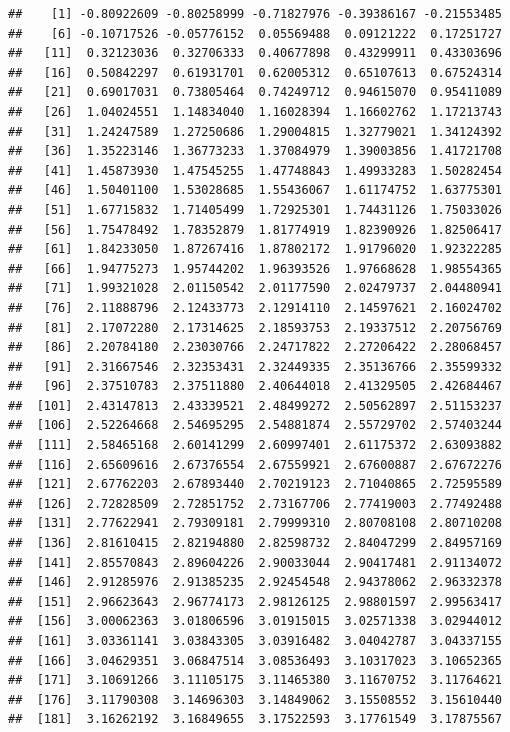 \documentclass[
  11pt]{report}
\begin{document}
\begin{itemize}
\begin{verbatim}
##    [1] -0.80922609 -0.80258999 -0.71827976 -0.39386167 -0.21553485
##    [6] -0.10717526 -0.05776152  0.05569488  0.09121222  0.17251727
##   [11]  0.32123036  0.32706333  0.40677898  0.43299911  0.43303696
##   [16]  0.50842297  0.61931701  0.62005312  0.65107613  0.67524314
##   [21]  0.69017031  0.73805464  0.74249712  0.94615070  0.95411089
##   [26]  1.04024551  1.14834040  1.16028394  1.16602762  1.17213743
##   [31]  1.24247589  1.27250686  1.29004815  1.32779021  1.34124392
##   [36]  1.35223146  1.36773233  1.37084979  1.39003856  1.41721708
##   [41]  1.45873930  1.47545255  1.47748843  1.49933283  1.50282454
##   [46]  1.50401100  1.53028685  1.55436067  1.61174752  1.63775301
##   [51]  1.67715832  1.71405499  1.72925301  1.74431126  1.75033026
##   [56]  1.75478492  1.78352879  1.81774919  1.82390926  1.82506417
##   [61]  1.84233050  1.87267416  1.87802172  1.91796020  1.92322285
##   [66]  1.94775273  1.95744202  1.96393526  1.97668628  1.98554365
##   [71]  1.99321028  2.01150542  2.01177590  2.02479737  2.04480941
##   [76]  2.11888796  2.12433773  2.12914110  2.14597621  2.16024702
##   [81]  2.17072280  2.17314625  2.18593753  2.19337512  2.20756769
##   [86]  2.20784180  2.23030766  2.24717822  2.27206422  2.28068457
##   [91]  2.31667546  2.32353431  2.32449335  2.35136766  2.35599332
##   [96]  2.37510783  2.37511880  2.40644018  2.41329505  2.42684467
##  [101]  2.43147813  2.43339521  2.48499272  2.50562897  2.51153237
##  [106]  2.52264668  2.54695295  2.54881874  2.55729702  2.57403244
##  [111]  2.58465168  2.60141299  2.60997401  2.61175372  2.63093882
##  [116]  2.65609616  2.67376554  2.67559921  2.67600887  2.67672276
##  [121]  2.67762203  2.67893440  2.70219123  2.71040865  2.72595589
##  [126]  2.72828509  2.72851752  2.73167706  2.77419003  2.77492488
##  [131]  2.77622941  2.79309181  2.79999310  2.80708108  2.80710208
##  [136]  2.81610415  2.82194880  2.82598732  2.84047299  2.84957169
##  [141]  2.85570843  2.89604226  2.90033044  2.90417481  2.91134072
##  [146]  2.91285976  2.91385235  2.92454548  2.94378062  2.96332378
##  [151]  2.96623643  2.96774173  2.98126125  2.98801597  2.99563417
##  [156]  3.00062363  3.01806596  3.01915015  3.02571338  3.02944012
##  [161]  3.03361141  3.03843305  3.03916482  3.04042787  3.04337155
##  [166]  3.04629351  3.06847514  3.08536493  3.10317023  3.10652365
##  [171]  3.10691266  3.11105175  3.11465380  3.11670752  3.11764621
##  [176]  3.11790308  3.14696303  3.14849062  3.15508552  3.15610440
##  [181]  3.16262192  3.16849655  3.17522593  3.17761549  3.17875567

\end{verbatim}
\end{itemize}
\end{document}
